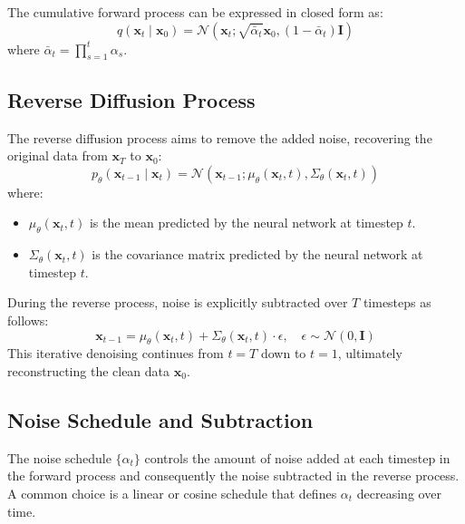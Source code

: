 \documentclass[11pt]{article}
\begin{document}
The cumulative forward process can be expressed in closed form as:
\begin{equation}
    q(\mathbf{x}_t \mid \mathbf{x}_0) = \mathcal{N} \left( \mathbf{x}_t; \sqrt{\bar{\alpha}_t} \mathbf{x}_0, (1 - \bar{\alpha}_t) \mathbf{I} \right)
    \label{eq:forward_closed}
\end{equation}
where \( \bar{\alpha}_t = \prod_{s=1}^t \alpha_s \).

\subsection{Reverse Diffusion Process}
The reverse diffusion process aims to remove the added noise, recovering the original data from \( \mathbf{x}_T \) to \( \mathbf{x}_0 \):
\begin{equation}
    p_\theta(\mathbf{x}_{t-1} \mid \mathbf{x}_t) = \mathcal{N} \left( \mathbf{x}_{t-1}; \mu_\theta(\mathbf{x}_t, t), \Sigma_\theta(\mathbf{x}_t, t) \right)
    \label{eq:reverse_step}
\end{equation}
where:
\begin{itemize}[leftmargin=*]
    \item \( \mu_\theta(\mathbf{x}_t, t) \) is the mean predicted by the neural network at timestep \( t \).
    \item \( \Sigma_\theta(\mathbf{x}_t, t) \) is the covariance matrix predicted by the neural network at timestep \( t \).
\end{itemize}

During the reverse process, noise is explicitly subtracted over \( T \) timesteps as follows:
\begin{equation}
    \mathbf{x}_{t-1} = \mu_\theta(\mathbf{x}_t, t) + \Sigma_\theta(\mathbf{x}_t, t) \cdot \epsilon, \quad \epsilon \sim \mathcal{N}(0, \mathbf{I})
    \label{eq:noise_subtraction}
\end{equation}
This iterative denoising continues from \( t = T \) down to \( t = 1 \), ultimately reconstructing the clean data \( \mathbf{x}_0 \).

\subsection{Noise Schedule and Subtraction}
The noise schedule \( \{\alpha_t\} \) controls the amount of noise added at each timestep in the forward process and consequently the noise subtracted in the reverse process. A common choice is a linear or cosine schedule that defines \( \alpha_t \) decreasing over time.
\end{document}
